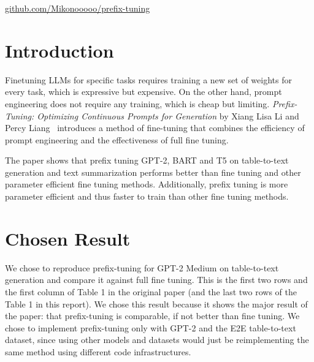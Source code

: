 \documentclass[11pt]{article} %
\author{Mac Turner, Michael Ngo, Eric Hu, Neeraj Parihar}
\begin{document}
\maketitle
\begin{center}
    \vspace{-2em}
    \href{https://github.com/Mikonooooo/prefix-tuning}{github.com/Mikonooooo/prefix-tuning}
\end{center}

\section{Introduction}
Finetuning LLMs for specific tasks requires training a new set of weights for every task, which is expressive but expensive. On the other hand, prompt engineering does not require any training, which is cheap but limiting. \textit{Prefix-Tuning: Optimizing Continuous Prompts for Generation} by Xiang Lisa Li and Percy Liang~\cite{li-liang-2021-prefix} introduces a method of fine-tuning that combines the efficiency of prompt engineering and the effectiveness of full fine tuning.

The paper shows that prefix tuning GPT-2, BART and T5 on table-to-text generation and text summarization performs better than fine tuning and other parameter efficient fine tuning methods. Additionally, prefix tuning is more parameter efficient and thus faster to train than other fine tuning methods.

\section{Chosen Result}

We chose to reproduce prefix-tuning for GPT-2 Medium on table-to-text generation and compare it against full fine tuning. This is the first two rows and the first column of Table 1 in the original paper (and the last two rows of the Table 1 in this report). We chose this result because it shows the major result of the paper: that prefix-tuning is comparable, if not better than fine tuning. We chose to implement prefix-tuning only with GPT-2 and the E2E table-to-text dataset, since using other models and datasets would just be reimplementing the same method using different code infrastructures. 


\end{document}
